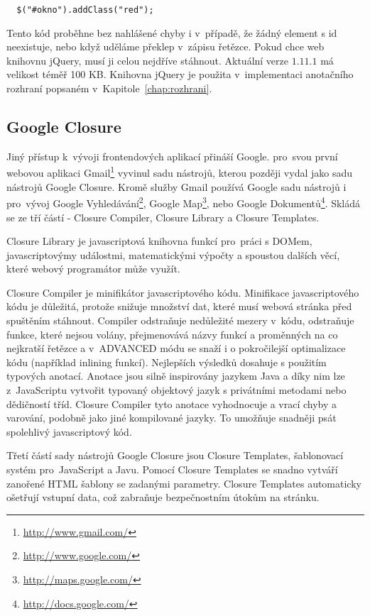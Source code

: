 \begin{lstlisting}
  $("#okno").addClass("red");
\end{lstlisting}

Tento kód proběhne bez nahlášené chyby i v~případě, že žádný element s id  neexistuje, nebo když uděláme překlep v~zápisu řetězce. Pokud chce web knihovnu jQuery, musí ji celou nejdříve stáhnout. Aktuální verze $1.11.1$ má velikost téměř 100 KB. Knihovna jQuery je použita v~implementaci anotačního rozhraní popsaném v~Kapitole~\ref{chap:rozhrani}.

\subsection{Google Closure}
Jiný přístup k~vývoji frontendových aplikací přináší Google. pro~svou první webovou aplikaci Gmail\footnote{\url{http://www.gmail.com/}} vyvinul sadu nástrojů, kterou později vydal jako sadu nástrojů Google Closure\cite{closure}. Kromě služby Gmail používá Google sadu nástrojů i pro~vývoj Google Vyhledávání\footnote{\url{http://www.google.com/}}, Google Map\footnote{\url{http://maps.google.com/}}, nebo Google Dokumentů\footnote{\url{http://docs.google.com/}}. Skládá se ze tří částí - Closure Compiler, Closure Library a Closure Templates.

Closure Library je javascriptová knihovna funkcí pro~práci s DOMem, javascriptovýmy událostmi, matematickými výpočty a spoustou dalších věcí, které webový programátor může využít.

Closure Compiler je minifikátor javascriptového kódu. Minifikace javascriptového kódu je důležitá, protože snižuje množství dat, které musí webová stránka před spuštěním stáhnout. Compiler odstraňuje nedůležité mezery v~kódu, odstraňuje funkce, které nejsou volány, přejmenovává názvy funkcí a proměnných na co nejkratší řetězce a v~ADVANCED módu se snaží i o pokročilejší optimalizace kódu (například inlining funkcí). Nejlepších výsledků dosahuje s použitím typových anotací. Anotace jsou silně inspirovány jazykem Java a díky nim lze z~JavaScriptu vytvořit typovaný objektový jazyk s privátními metodami nebo dědičností tříd. Closure Compiler tyto anotace vyhodnocuje a vrací chyby a varování, podobně jako jiné kompilované jazyky. To umožňuje snadněji psát spolehlivý javascriptový kód.

Třetí částí sady nástrojů Google Closure jsou Closure Templates, šablonovací systém pro~JavaScript a Javu. Pomocí Closure Templates se snadno vytváří zanořené HTML šablony se zadanými parametry. Closure Templates automaticky ošetřují vstupní data, což zabraňuje bezpečnostním útokům na stránku.

